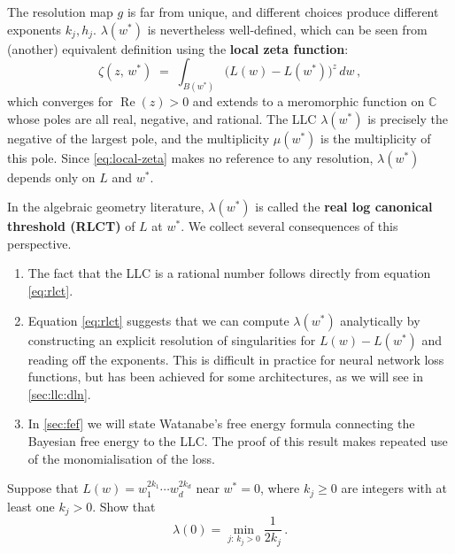 \documentclass[11pt]{article}
\begin{document}
The resolution map $g$ is far from unique, and different choices
produce different exponents $k_j, h_j$.
$\lambda(w^*)$ is nevertheless well-defined, which can be seen from (another) equivalent definition using the \textbf{local zeta function}:
\begin{equation}\label{eq:local-zeta}
    \zeta(z,\, w^*) \;=\; \int_{B(w^*)}
        \bigl(L(w) - L(w^*)\bigr)^{\!z} \, dw\,,
\end{equation}
which converges for $\operatorname{Re}(z) > 0$ and extends to a
meromorphic function on $\mathbb{C}$ whose poles are all real,
negative, and rational.
The LLC $\lambda(w^*)$ is precisely the negative of the largest pole, and
the multiplicity $\mu(w^*)$ is the multiplicity of this pole.
Since \eqref{eq:local-zeta} makes no reference to any resolution,
$\lambda(w^*)$ depends only on $L$ and $w^*$. 

In the algebraic geometry literature, $\lambda(w^*)$ is called the
\textbf{real log canonical threshold (RLCT)} of $L$ at
$w^*$.
We collect several consequences of this perspective.

\begin{enumerate}
    \item The fact that the LLC is a rational number follows directly from equation \eqref{eq:rlct}.
    \item Equation \eqref{eq:rlct} suggests that we can compute 
        $\lambda(w^*)$ analytically by constructing an explicit resolution
        of singularities for $L(w) - L(w^*)$ and reading off the
        exponents.
        This is difficult in practice for neural network loss
        functions, but has been achieved for some architectures, as
        we will see in \cref{sec:llc:dln}.

    \item
        In \cref{sec:fef} we will state Watanabe's free energy formula
        connecting the Bayesian free energy to the LLC\@. The proof of this
        result makes repeated use of the monomialisation of the loss.
\end{enumerate}

\begin{exercise}
\label{ex:rlct-computation}
    Suppose that $L(w) = w_1^{2k_1} \cdots w_d^{2k_d}$ near
    $w^* = 0$, where $k_j \geq 0$ are integers with at least
    one $k_j > 0$. Show that
    \[
        \lambda(0) = \min_{j:\, k_j > 0} \frac{1}{2k_j}\,.
    \]
\end{exercise}
\end{document}
